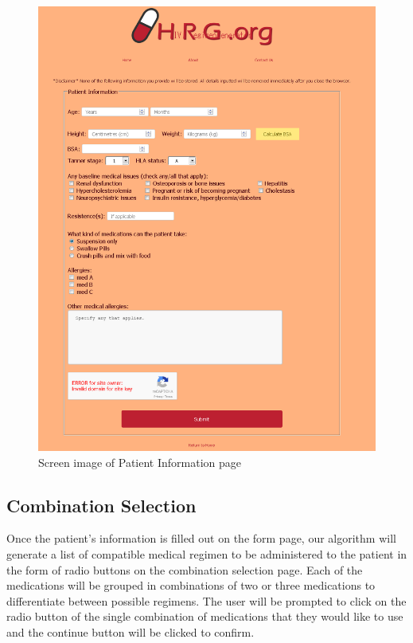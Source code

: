 \documentclass[12pt]{article}
\begin{document}
\begin{figure}[H]
  \centering
  \includegraphics[width=\linewidth]{form1.png}
 \caption{Screen image of Patient Information page}
  \label{fig:form1}
\end{figure}

\subsection{Combination Selection}
Once the patient's information is filled out on the form page, our algorithm will generate a list of compatible medical regimen to be administered to the patient in the form of radio buttons on the combination selection page. Each of the medications will be grouped in combinations of two or three medications to differentiate between possible regimens. The user will be prompted to click on the radio button of the single combination of medications that they would like to use and the continue button will be clicked to confirm.
\end{document}
